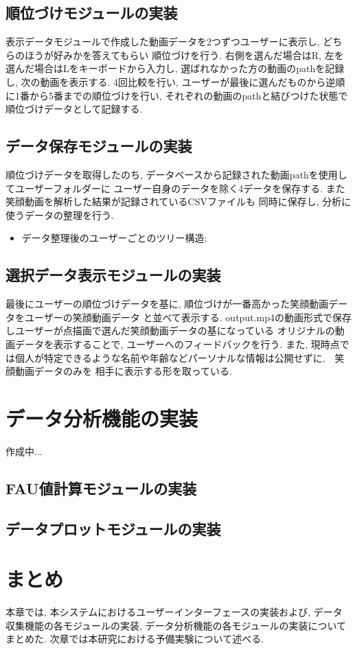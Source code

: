 \subsection{順位づけモジュールの実装}
表示データモジュールで作成した動画データを2つずつユーザーに表示し, どちらのほうが好みかを答えてもらい
順位づけを行う. 右側を選んだ場合はR, 左を選んだ場合はLをキーボードから入力し,
選ばれなかった方の動画のpathを記録し, 次の動画を表示する.
4回比較を行い, ユーザーが最後に選んだものから逆順に1番から5番までの順位づけを行い,
それぞれの動画のpathと結びつけた状態で順位づけデータとして記録する.

\subsection{データ保存モジュールの実装}
順位づけデータを取得したのち, データベースから記録された動画pathを使用してユーザーフォルダーに
ユーザー自身のデータを除く4データを保存する. また笑顔動画を解析した結果が記録されているCSVファイルも
同時に保存し, 分析に使うデータの整理を行う.

\begin{itemize}
\item データ整理後のユーザーごとのツリー構造:
\end{itemize}

\subsection{選択データ表示モジュールの実装}
最後にユーザーの順位づけデータを基に, 順位づけが一番高かった笑顔動画データをユーザーの笑顔動画データ
と並べて表示する. output.mp4の動画形式で保存しユーザーが点描画で選んだ笑顔動画データの基になっている
オリジナルの動画データを表示することで, ユーザーへのフィードバックを行う.
また, 現時点では個人が特定できるような名前や年齢などパーソナルな情報は公開せずに,　笑顔動画データのみを
相手に表示する形を取っている.

\section{データ分析機能の実装}
作成中...
\subsection{FAU値計算モジュールの実装}
\subsection{データプロットモジュールの実装}
\section{まとめ}
本章では, 本システムにおけるユーザーインターフェースの実装および, データ収集機能の各モジュールの実装,
データ分析機能の各モジュールの実装についてまとめた.
次章では本研究における予備実験について述べる.
